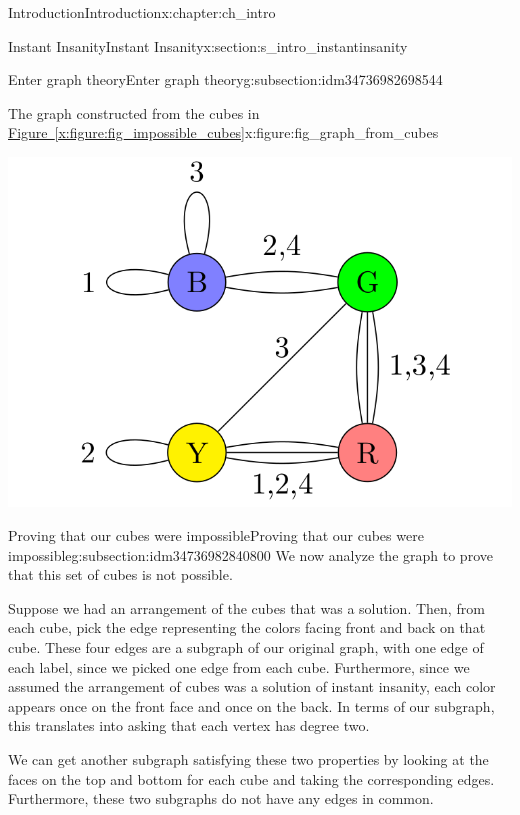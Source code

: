 \documentclass[oneside,10pt,]{book}
\newcommand{\xreffont}{\relax}
\numberwithin{equation}{section}
\begin{document}
\begin{chapterptx}{Introduction}{}{Introduction}{}{}{x:chapter:ch_intro}
\begin{sectionptx}{Instant Insanity}{}{Instant Insanity}{}{}{x:section:s_intro_instantinsanity}
\begin{subsectionptx}{Enter graph theory}{}{Enter graph theory}{}{}{g:subsection:idm34736982698544}
\begin{figureptx}{The graph constructed from the cubes in \hyperref[x:figure:fig_impossible_cubes]{Figure~{\xreffont\ref{x:figure:fig_impossible_cubes}}}}{x:figure:fig_graph_from_cubes}{}%
\begin{image}{0.05}{0.9}{0.05}%
\includegraphics[width=\linewidth]{images/InstantInsanityImpossibleGraph.png}
\end{image}%
\tcblower
\end{figureptx}%
\end{subsectionptx}
%
%
\typeout{************************************************}
\typeout{************************************************}
%
\begin{subsectionptx}{Proving that our cubes were impossible}{}{Proving that our cubes were impossible}{}{}{g:subsection:idm34736982840800}
We now analyze the graph to prove that this set of cubes is not possible.%
\par
Suppose we had an arrangement of the cubes that was a solution. Then, from each cube, pick the edge representing the colors facing front and back on that cube. These four edges are a subgraph of our original graph, with one edge of each label, since we picked one edge from each cube. Furthermore, since we assumed the arrangement of cubes was a solution of instant insanity, each color appears once on the front face and once on the back. In terms of our subgraph, this translates into asking that each vertex has degree two.%
\par
We can get another subgraph satisfying these two properties by looking at the faces on the top and bottom for each cube and taking the corresponding edges. Furthermore, these two subgraphs do not have any edges in common.%

\end{subsectionptx}
\end{sectionptx}
\end{chapterptx}
\end{document}
